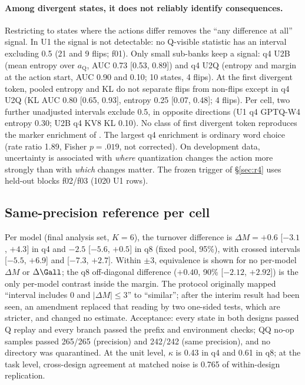 \paragraph{Among divergent states, it does not reliably identify consequences.} Restricting to states where the actions differ removes the ``any difference at all'' signal. In U1 the signal is not detectable: no Q-visible statistic has an interval excluding 0.5 (21 and 9 flips; f01). Only small sub-banks keep a signal: q4 U2B (mean entropy over $a_{\mathrm{Q}}$, AUC 0.73 [0.53, 0.89]) and q4 U2Q (entropy and margin at the action start, AUC 0.90 and 0.10; 10 states, 4 flips). At the first divergent token, pooled entropy and KL do not separate flips from non-flips except in q4 U2Q (KL AUC 0.80 [0.65, 0.93], entropy 0.25 [0.07, 0.48]; 4 flips). Per cell, two further unadjusted intervals exclude 0.5, in opposite directions (U1 q4 GPTQ-W4 entropy 0.30; U2B q4 KV8 KL 0.10). No class of first divergent token reproduces the marker enrichment of \citet{lotfi2026quantized}. The largest q4 enrichment is ordinary word choice (rate ratio 1.89, Fisher $p=.019$, not corrected). %
On development data, uncertainty is associated with \emph{where} quantization changes the action more strongly than with \emph{which} changes matter. The frozen trigger of \S\ref{sec:r4} uses held-out blocks f02/f03 (1020 U1 rows). %

\subsection{Same-precision reference per cell}
\label{app:sameprec}

Per model (final analysis set, $K=6$), the turnover difference is $\Delta M=+0.6$ [$-3.1$, $+4.3$]\pp{} in q4 and $-2.5$ [$-5.6$, $+0.5$] in q8 (fixed pool, 95\%), with crossed intervals [$-5.5$, $+6.9$] and [$-7.3$, $+2.7$]. Within $\pm$3\pp{}, equivalence is shown for no per-model $\Delta M$ or $\Delta\Gall$; the q8 off-diagonal difference ($+0.40$, 90\% [$-2.12$, $+2.92$]) is the only per-model contrast inside the margin. The protocol originally mapped ``interval includes 0 and $|\Delta M|\le3$\pp{}'' to ``similar''; after the interim result had been seen, an amendment replaced that reading by two one-sided tests, which are stricter, and changed no estimate. %
Acceptance: every state in both designs passed Q replay and every branch passed the prefix and environment checks; QQ no-op samples passed 265/265 (precision) and 242/242 (same precision), and no directory was quarantined. At the unit level, $\kappa$ is 0.43 in q4 and 0.61 in q8; at the task level, cross-design agreement at matched noise is 0.765 of within-design replication. %


